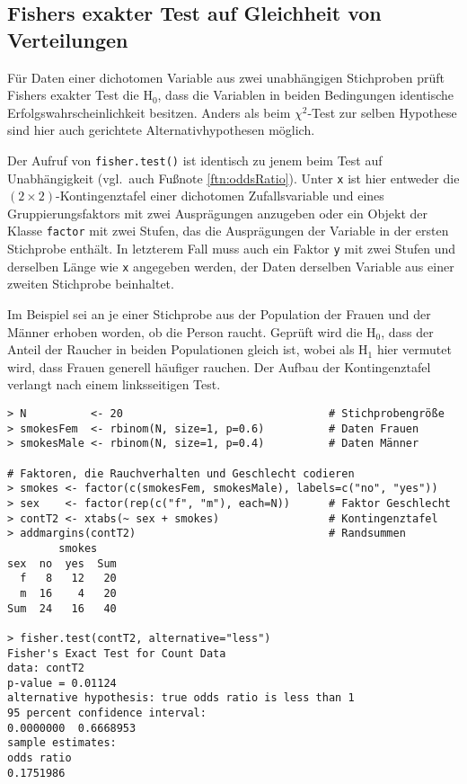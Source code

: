 \subsection{Fishers exakter Test auf Gleichheit von Verteilungen}
\label{sec:fisherEq}

Für Daten einer dichotomen Variable aus zwei unabhängigen Stichproben prüft Fishers exakter Test die $\text{H}_{0}$, dass die Variablen in beiden Bedingungen identische Erfolgswahrscheinlichkeit besitzen. Anders als beim $\chi^{2}$-Test zur selben Hypothese sind hier auch gerichtete Alternativhypothesen möglich.

Der Aufruf von \lstinline!fisher.test()! ist identisch zu jenem beim Test auf Unabhängigkeit (vgl.\ auch Fußnote \ref{ftn:oddsRatio}). Unter \lstinline!x! ist hier entweder die $(2 \times 2)$-Kontingenztafel einer dichotomen Zufallsvariable und eines Gruppierungsfaktors mit zwei Ausprägungen anzugeben oder ein Objekt der Klasse \lstinline!factor! mit zwei Stufen, das die Ausprägungen der Variable in der ersten Stichprobe enthält. In letzterem Fall muss auch ein Faktor \lstinline!y! mit zwei Stufen und derselben Länge wie \lstinline!x! angegeben werden, der Daten derselben Variable aus einer zweiten Stichprobe beinhaltet.

Im Beispiel sei an je einer Stichprobe aus der Population der Frauen und der Männer erhoben worden, ob die Person raucht. Geprüft wird die $\text{H}_{0}$, dass der Anteil der Raucher in beiden Populationen gleich ist, wobei als $\text{H}_{1}$ hier vermutet wird, dass Frauen generell häufiger rauchen. Der Aufbau der Kontingenztafel verlangt nach einem linksseitigen Test.
\begin{lstlisting}
> N          <- 20                                # Stichprobengröße
> smokesFem  <- rbinom(N, size=1, p=0.6)          # Daten Frauen
> smokesMale <- rbinom(N, size=1, p=0.4)          # Daten Männer

# Faktoren, die Rauchverhalten und Geschlecht codieren
> smokes <- factor(c(smokesFem, smokesMale), labels=c("no", "yes"))
> sex    <- factor(rep(c("f", "m"), each=N))      # Faktor Geschlecht
> contT2 <- xtabs(~ sex + smokes)                 # Kontingenztafel
> addmargins(contT2)                              # Randsummen
        smokes
sex  no  yes  Sum
  f   8   12   20
  m  16    4   20
Sum  24   16   40

> fisher.test(contT2, alternative="less")
Fisher's Exact Test for Count Data
data: contT2
p-value = 0.01124
alternative hypothesis: true odds ratio is less than 1
95 percent confidence interval:
0.0000000  0.6668953
sample estimates:
odds ratio
0.1751986
\end{lstlisting}

